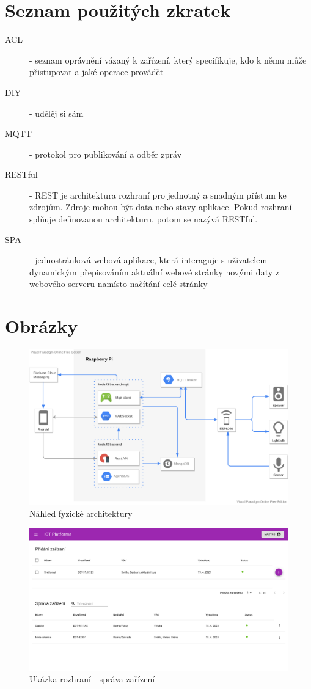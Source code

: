 \documentclass[thesis=B,czech]{FITthesis}[2019/12/23]
\begin{document}
\chapter{Seznam použitých zkratek}
\begin{description}
    \item[ACL] - seznam oprávnění vázaný k zařízení, který specifikuje, kdo k němu může přistupovat a jaké operace provádět
    \item[DIY] - udělěj si sám
    \item[MQTT] -  protokol pro publikování a odběr zpráv
    \item[RESTful] - REST je architektura rozhraní pro jednotný a snadným přístum ke zdrojům. Zdroje mohou být data nebo stavy aplikace. Pokud rozhraní splňuje definovanou architekturu, potom se nazývá RESTful.
    \item[SPA] - jednostránková webová aplikace, která interaguje s uživatelem dynamickým přepisováním aktuální webové stránky novými daty z webového serveru namísto načítání celé stránky
\end{description}

\chapter{Obrázky}
\begin{figure}[htbp]
    \centering
    \includegraphics[width=\textwidth]{img/architecture.pdf}
    \caption{Náhled fyzické architektury}
\end{figure}

\begin{figure}[htbp]
    \centering
    \includegraphics[width=\textwidth]{img/screens/deviceManagement2.png}
    \caption{Ukázka rozhraní - správa zařízení}
\end{figure}
\end{document}
